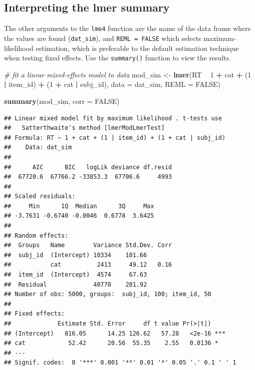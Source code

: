 \documentclass[doc,floatsintext]{apa6}
\newenvironment{Shaded}{\begin{snugshade}}{\end{snugshade}}
\newcommand{\KeywordTok}[1]{\textcolor[rgb]{0.13,0.29,0.53}{\textbf{#1}}}
\newcommand{\DataTypeTok}[1]{\textcolor[rgb]{0.13,0.29,0.53}{#1}}
\newcommand{\DecValTok}[1]{\textcolor[rgb]{0.00,0.00,0.81}{#1}}
\newcommand{\StringTok}[1]{\textcolor[rgb]{0.31,0.60,0.02}{#1}}
\newcommand{\CommentTok}[1]{\textcolor[rgb]{0.56,0.35,0.01}{\textit{#1}}}
\newcommand{\OtherTok}[1]{\textcolor[rgb]{0.56,0.35,0.01}{#1}}
\newcommand{\OperatorTok}[1]{\textcolor[rgb]{0.81,0.36,0.00}{\textbf{#1}}}
\newcommand{\NormalTok}[1]{#1}
\begin{document}
\subsection{Interpreting the lmer
summary}\label{interpreting-the-lmer-summary}

The other arguments to the \texttt{lme4} function are the name of the
data frame where the values are found (\texttt{dat\_sim}), and
\texttt{REML\ =\ FALSE} which selects maximum-likelihood estimation,
which is preferable to the default estimation technique when testing
fixed effects. Use the \texttt{summary()} function to view the results.

\begin{Shaded}
\begin{Highlighting}[]
\CommentTok{# fit a linear mixed-effects model to data}
\NormalTok{mod_sim <-}\StringTok{ }\KeywordTok{lmer}\NormalTok{(RT }\OperatorTok{~}\StringTok{ }\DecValTok{1} \OperatorTok{+}\StringTok{ }\NormalTok{cat }\OperatorTok{+}\StringTok{ }\NormalTok{(}\DecValTok{1} \OperatorTok{|}\StringTok{ }\NormalTok{item_id) }\OperatorTok{+}\StringTok{ }\NormalTok{(}\DecValTok{1} \OperatorTok{+}\StringTok{ }\NormalTok{cat }\OperatorTok{|}\StringTok{ }\NormalTok{subj_id),}
                \DataTypeTok{data =}\NormalTok{ dat_sim, }\DataTypeTok{REML =} \OtherTok{FALSE}\NormalTok{)}

\KeywordTok{summary}\NormalTok{(mod_sim, }\DataTypeTok{corr =} \OtherTok{FALSE}\NormalTok{)}
\end{Highlighting}
\end{Shaded}

\begin{verbatim}
## Linear mixed model fit by maximum likelihood . t-tests use
##   Satterthwaite's method [lmerModLmerTest]
## Formula: RT ~ 1 + cat + (1 | item_id) + (1 + cat | subj_id)
##    Data: dat_sim
## 
##      AIC      BIC   logLik deviance df.resid 
##  67720.6  67766.2 -33853.3  67706.6     4993 
## 
## Scaled residuals: 
##     Min      1Q  Median      3Q     Max 
## -3.7631 -0.6740 -0.0046  0.6778  3.6425 
## 
## Random effects:
##  Groups   Name        Variance Std.Dev. Corr
##  subj_id  (Intercept) 10334    101.66       
##           cat          2413     49.12   0.16
##  item_id  (Intercept)  4574     67.63       
##  Residual             40770    201.92       
## Number of obs: 5000, groups:  subj_id, 100; item_id, 50
## 
## Fixed effects:
##             Estimate Std. Error     df t value Pr(>|t|)    
## (Intercept)   816.05      14.25 126.62   57.28   <2e-16 ***
## cat            52.42      20.56  55.35    2.55   0.0136 *  
## ---
## Signif. codes:  0 '***' 0.001 '**' 0.01 '*' 0.05 '.' 0.1 ' ' 1
\end{verbatim}
\end{document}

